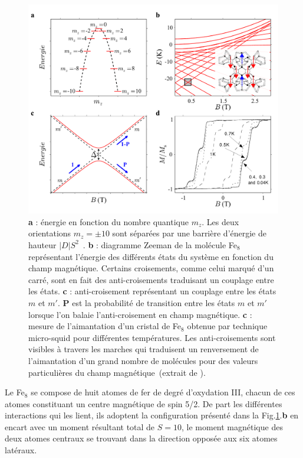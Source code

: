 \begin{figure}
\centering \includegraphics[scale=0.45]{Spintronique/FigureFe8/FigureFe8.pdf} 
\caption{\textbf{a} : énergie en fonction du nombre quantique $m_z$. Les deux orientations $m_z=\pm 10$ sont séparées par une barrière d'énergie de hauteur $|D|S^2$~\cite{Bogani2008}. \textbf{b} : diagramme Zeeman de la molécule Fe$_8$ représentant l'énergie des différents états du système en fonction du champ magnétique. Certains croisements, comme celui marqué d'un carré, sont en fait des anti-croisements traduisant un couplage entre les états. \textbf{c} : anti-croisement représentant un couplage entre les états $m$ et $m'$. \textbf{P} est la probabilité de transition entre les états $m$ et $m'$ lorsque l'on balaie l'anti-croisement en champ magnétique. \textbf{c} : mesure de l'aimantation d'un cristal de Fe$_8$ obtenue par technique micro-squid pour différentes températures. Les anti-croisements sont visibles à travers les marches qui traduisent un renversement de l'aimantation d'un grand nombre de molécules pour des valeurs particulières du champ magnétique~(extrait de \cite{MagGoesNano}).}
\label{Fe8Zeeman}
\end{figure}


Le Fe$_8$ se compose de huit atomes de fer de degré d'oxydation III, chacun de ces atomes constituant un centre magnétique de spin 5/2. De part les différentes interactions qui les lient, ils adoptent la configuration présenté dans la Fig.\ref{Fe8Zeeman}.\textbf{b} en encart avec un moment résultant total de $S=10$, le moment magnétique des deux atomes centraux se trouvant dans la direction opposée aux six atomes latéraux.

